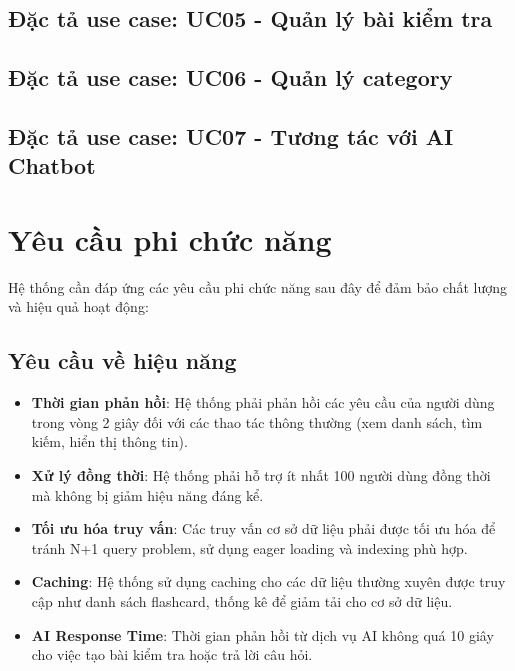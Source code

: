 \documentclass[../DoAn.tex]{subfiles}
\begin{document}
\subsection{Đặc tả use case: UC05 - Quản lý bài kiểm tra}
\hfill

\subsection{Đặc tả use case: UC06 - Quản lý category}
\hfill

\subsection{Đặc tả use case: UC07 - Tương tác với AI Chatbot}
\hfill

\section{Yêu cầu phi chức năng}
\label{section:2.4}
Hệ thống cần đáp ứng các yêu cầu phi chức năng sau đây để đảm bảo chất lượng và hiệu quả hoạt động:

\subsection{Yêu cầu về hiệu năng}
\begin{itemize}
    \item \textbf{Thời gian phản hồi}: Hệ thống phải phản hồi các yêu cầu của người dùng trong vòng 2 giây đối với các thao tác thông thường (xem danh sách, tìm kiếm, hiển thị thông tin).
    \item \textbf{Xử lý đồng thời}: Hệ thống phải hỗ trợ ít nhất 100 người dùng đồng thời mà không bị giảm hiệu năng đáng kể.
    \item \textbf{Tối ưu hóa truy vấn}: Các truy vấn cơ sở dữ liệu phải được tối ưu hóa để tránh N+1 query problem, sử dụng eager loading và indexing phù hợp.
    \item \textbf{Caching}: Hệ thống sử dụng caching cho các dữ liệu thường xuyên được truy cập như danh sách flashcard, thống kê để giảm tải cho cơ sở dữ liệu.
    \item \textbf{AI Response Time}: Thời gian phản hồi từ dịch vụ AI không quá 10 giây cho việc tạo bài kiểm tra hoặc trả lời câu hỏi.
\end{itemize}
\end{document}
